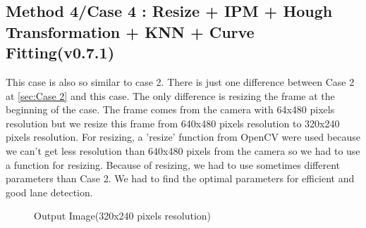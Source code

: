 \subsection{Method 4/Case 4 : Resize + IPM + Hough Transformation + KNN + Curve Fitting(v0.7.1)}\label{sec:Case 4}

This case is also so similar to case 2. There is just one difference between Case 2 at \ref{sec:Case 2} and this case. The only difference is resizing the frame at the beginning of the case. The frame comes from the camera with 64x480 pixels resolution but we resize this frame from 640x480 pixels resolution to 320x240 pixels resolution. For resizing, a 'resize' function from OpenCV were used because we can't get less resolution than 640x480 pixels from the camera so we had to use a function for resizing. Because of resizing, we had to use sometimes different parameters than Case 2. We had to find the optimal parameters for efficient and good lane detection.

\begin{figure}[H]
  \centering
  \caption{Output Image(320x240 pixels resolution)}
\end{figure}

%
